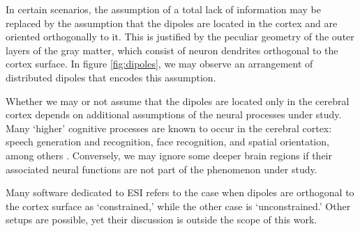 In certain scenarios, the assumption of a total lack of information may be replaced by the assumption that the dipoles are located in the cortex and are oriented orthogonally to it.
%
This is justified by the peculiar geometry of the outer layers of the gray matter, which consist of neuron dendrites orthogonal to the cortex surface.
%
In figure \ref{fig:dipoles}, we may observe an arrangement of distributed dipoles that encodes this assumption.

Whether we may or not assume that the dipoles are located only in the cerebral cortex depends on additional assumptions of the neural processes under study.
%
Many `higher' cognitive processes are known to occur in the cerebral cortex: speech generation and recognition, face recognition, and spatial orientation, among others \cite{Saladin_Gan_2020}.
%
Conversely, we may ignore some deeper brain regions if their associated neural functions are not part of the phenomenon under study.

Many software dedicated to ESI refers to the case when dipoles are orthogonal to the cortex surface as `constrained,' while the other case is `unconstrained.' 
%
Other setups are possible, yet their discussion is outside the scope of this work.

